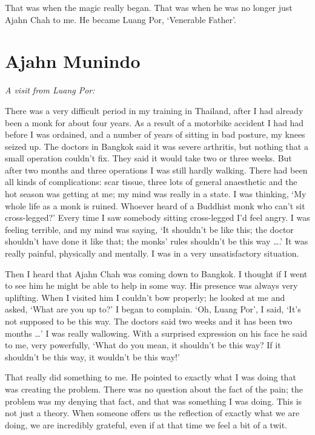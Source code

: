 That was when the magic really began. That was when he was no longer
just Ajahn Chah to me. He became Luang Por, `Venerable Father'. 

\section{Ajahn Munindo}

\emph{A visit from Luang Por:}

There was a very difficult period in my training in Thailand, after I
had already been a monk for about four years. As a result of a motorbike
accident I had had before I was ordained, and a number of years of
sitting in bad posture, my knees seized up. The doctors in Bangkok said
it was severe arthritis, but nothing that a small operation couldn't
fix. They said it would take two or three weeks. But after two months
and three operations I was still hardly walking. There had been all
kinds of complications: scar tissue, three lots of general anaesthetic
and the hot season was getting at me; my mind was really in a state. I
was thinking, `My whole life as a monk is ruined. Whoever heard of a
Buddhist monk who can't sit cross-legged?' Every time I saw somebody
sitting cross-legged I'd feel angry. I was feeling terrible, and my mind
was saying, `It shouldn't be like this; the doctor shouldn't have done
it like that; the monks' rules shouldn't be this way \ldots{}.' It was
really painful, physically and mentally. I was in a very unsatisfactory
situation. 

Then I heard that Ajahn Chah was coming down to Bangkok. I thought if I
went to see him he might be able to help in some way. His presence was
always very uplifting. When I visited him I couldn't bow properly; he
looked at me and asked, `What are you up to?' I began to complain. `Oh, 
Luang Por', I said, `It's not supposed to be this way. The doctors said
two weeks and it has been two months \ldots{}' I was really wallowing. 
With a surprised expression on his face he said to me, very powerfully, 
`What do you mean, it shouldn't be this way? If it shouldn't be
this way, it wouldn't be this way!'

That really did something to me. He pointed to exactly what I was doing
that was creating the problem. There was no question about the fact of
the pain; the problem was my denying that fact, and that was something I
was doing. This is not just a theory. When someone offers us the
reflection of exactly what we are doing, we are incredibly grateful, 
even if at that time we feel a bit of a twit. 

